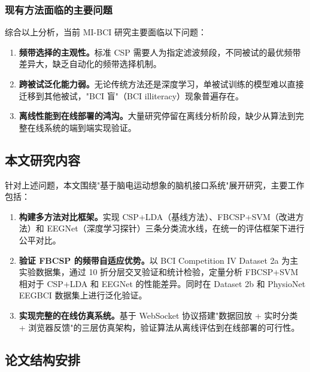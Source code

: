 \subsubsection{现有方法面临的主要问题}

综合以上分析，当前 MI-BCI 研究主要面临以下问题：

\begin{enumerate}[leftmargin=2em]
	\item \textbf{频带选择的主观性。}标准 CSP 需要人为指定滤波频段，不同被试的最优频带差异大，缺乏自动化的频带选择机制。
	\item \textbf{跨被试泛化能力弱。}无论传统方法还是深度学习，单被试训练的模型难以直接迁移到其他被试，"BCI 盲"（BCI illiteracy）现象普遍存在。
	\item \textbf{离线性能到在线部署的鸿沟。}大量研究停留在离线分析阶段，缺少从算法到完整在线系统的端到端实现验证。
\end{enumerate}

\subsection{本文研究内容}
\label{sec:research-content}

针对上述问题，本文围绕"基于脑电运动想象的脑机接口系统"展开研究，主要工作包括：

\begin{enumerate}[leftmargin=2em]
	\item \textbf{构建多方法对比框架。}实现 CSP+LDA（基线方法）、FBCSP+SVM（改进方法）和 EEGNet（深度学习探针）三条分类流水线，在统一的评估框架下进行公平对比。
	\item \textbf{验证 FBCSP 的频带自适应优势。}以 BCI Competition IV Dataset 2a 为主实验数据集，通过 10 折分层交叉验证和统计检验，定量分析 FBCSP+SVM 相对于 CSP+LDA 和 EEGNet 的性能差异。同时在 Dataset 2b 和 PhysioNet EEGBCI 数据集上进行泛化验证。
	\item \textbf{实现完整的在线仿真系统。}基于 WebSocket 协议搭建"数据回放 + 实时分类 + 浏览器反馈"的三层仿真架构，验证算法从离线评估到在线部署的可行性。
\end{enumerate}

\subsection{论文结构安排}
\label{sec:thesis-structure}

